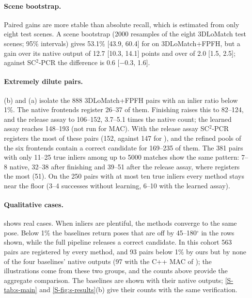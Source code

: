 \paragraph{Scene bootstrap.} Paired gains are more stable than absolute recall, which is estimated from only eight test scenes. A scene bootstrap (2000 resamples of the eight 3DLoMatch test scenes; 95\% intervals) gives 53.1\% [43.9, 60.4] for \ls{} on 3DLoMatch+FPFH, but a gain over its native output of 12.7 [10.3, 14.1] points and over \ngr{} of 2.0 [1.5, 2.5]; against SC$^2$-PCR the difference is 0.6 [$-0.3$, 1.6].

\paragraph{Extremely dilute pairs.} (b) and (a) isolate the 888 3DLoMatch+FPFH pairs with an inlier ratio below 1\%. The native frontends register 26--37 of them. Finishing raises this to 82--124, and the release assay to 106--152, 3.7--5.1 times the native count; the learned assay reaches 148--193 (not run for MAC). With the release assay SC$^2$-PCR registers the most of these pairs (152, against 147 for \ls{}), and the refined pools of the six frontends contain a correct candidate for 169--235 of them. The 381 pairs with only 11--25 true inliers among up to 5000 matches show the same pattern: 7--8 native, 32--38 after finishing and 39--51 after the release assay, where \ls{} registers the most (51). On the 250 pairs with at most ten true inliers every method stays near the floor (3--4 successes without learning, 6--10 with the learned assay).

\paragraph{Qualitative cases.}  shows real cases. When inliers are plentiful, the methods converge to the same pose. Below 1\% the baselines return poses that are off by 45--180$^\circ$ in the rows shown, while the full pipeline releases a correct candidate. In this cohort 563 pairs are registered by every method, and 93 pairs below 1\% by ours but by none of the four baselines' native outputs (97 with the C++ MAC of ); the illustrations come from these two groups, and the counts above provide the aggregate comparison. The baselines are shown with their native outputs; \cref{S-tab:s-main} and \cref{S-fig:s-results}(b) give their counts with the same verification.

